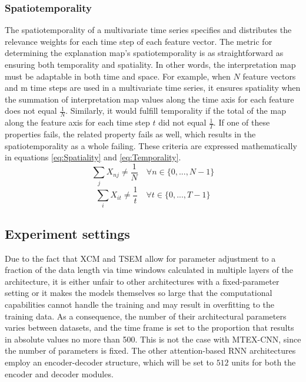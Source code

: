 \documentclass{svproc}
\begin{document}
\subsubsection{Spatiotemporality}

The spatiotemporality of a multivariate time series specifies and distributes the relevance weights for each time step of each feature vector. The metric for determining the explanation map's spatiotemporality is as straightforward as ensuring both temporality and spatiality. In other words, the interpretation map must be adaptable in both time and space. For example, when $N$ feature vectors and m time steps are used in a multivariate time series, it ensures spatiality when the summation of interpretation map values along the time axis for each feature does not equal $\frac{1}{N}$. Similarly, it would fulfill temporality if the total of the map along the feature axis for each time step $t$ did not equal $\frac{1}{T}$. If one of these properties fails, the related property fails as well, which results in the spatiotemporality as a whole failing.
These criteria are expressed mathematically in equations \ref{eq:Spatiality} and \ref{eq:Temporality}.
\begin{equation}
\sum_j X_{nj} \neq \frac{1}{N} \quad \forall{n} \in \{0, ..., N-1 \}
\label{eq:Spatiality}
\end{equation}
\begin{equation}
\sum_i X_{it} \neq \frac{1}{t} \quad \forall{t} \in \{0, ..., T-1 \}
\label{eq:Temporality}
\end{equation}

\subsection{Experiment settings}

Due to the fact that XCM and TSEM allow for parameter adjustment to a fraction of the data length via time windows calculated in multiple layers of the architecture, it is either unfair to other architectures with a fixed-parameter setting or it makes the models themselves so large that the computational capabilities cannot handle the training and may result in overfitting to the training data. As a consequence, the number of their architectural parameters varies between datasets, and the time frame is set to the proportion that results in absolute values no more than 500. This is not the case with MTEX-CNN, since the number of parameters is fixed. The other attention-based RNN architectures employ an encoder-decoder structure, which will be set to $512$ units for both the encoder and decoder modules. 
\end{document}
